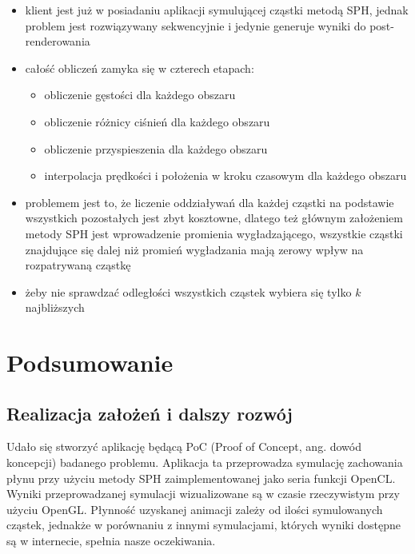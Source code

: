 \documentclass[polish, 12pt]{aghthesis}
\begin{document}
			\begin{itemize}
			
				\item klient jest już w posiadaniu aplikacji symulującej cząstki metodą SPH, jednak problem jest rozwiązywany sekwencyjnie i jedynie generuje wyniki do post-renderowania
				\item całość obliczeń zamyka się w czterech etapach:
				\begin{itemize}
				
					\item obliczenie gęstości dla każdego obszaru
					\item obliczenie różnicy ciśnień dla każdego obszaru
					\item obliczenie przyspieszenia dla każdego obszaru
					\item interpolacja prędkości i położenia w kroku czasowym dla każdego obszaru
				
				\end{itemize}
				\item problemem jest to, że liczenie oddziaływań dla każdej cząstki na podstawie wszystkich pozostałych jest zbyt kosztowne, dlatego też głównym założeniem metody SPH jest wprowadzenie promienia wygładzającego, wszystkie cząstki znajdujące się dalej niż promień wygładzania mają zerowy wpływ na rozpatrywaną cząstkę
				\item żeby nie sprawdzać odległości wszystkich cząstek wybiera się tylko $k$ najbliższych 
			
			\end{itemize}

\section{Podsumowanie}

	\subsection{Realizacja założeń i dalszy rozwój}
	
		Udało się stworzyć aplikację będącą PoC (Proof of Concept, ang. dowód koncepcji) badanego problemu. Aplikacja ta przeprowadza symulację zachowania płynu przy użyciu metody SPH zaimplementowanej jako seria funkcji OpenCL. Wyniki przeprowadzanej symulacji wizualizowane są w czasie rzeczywistym przy użyciu OpenGL. Płynność uzyskanej animacji zależy od ilości symulowanych cząstek, jednakże w porównaniu z innymi symulacjami, których wyniki dostępne są w internecie, spełnia nasze oczekiwania.
		
\end{document}
